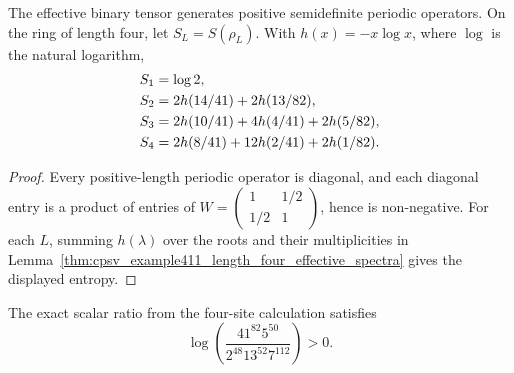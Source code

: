 \begin{lemma}
    \label{thm:cpsv_example411_length_four_effective_entropies}
    \leanok
    The effective binary tensor generates positive semidefinite periodic
    operators.  On the ring of length four, let $S_L=S(\rho_L)$.  With
    $h(x)=-x\log x$, where $\log$ is the natural logarithm,
    \begin{align}
        S_1 & =\log 2,\notag                      \\
        S_2 & =2h(14/41)+2h(13/82),\notag         \\
        S_3 & =2h(10/41)+4h(4/41)+2h(5/82),\notag \\
        S_4 & =2h(8/41)+12h(2/41)+2h(1/82).
        \notag
    \end{align}
\end{lemma}

\begin{proof}
    \leanok
    Every positive-length periodic operator is diagonal, and each diagonal
    entry is a product of entries of
    $W=\left(\begin{smallmatrix}1&1/2\\1/2&1\end{smallmatrix}\right)$, hence is
    non-negative.  For each $L$, summing $h(\lambda)$ over the roots and their
    multiplicities in
    Lemma~\ref{thm:cpsv_example411_length_four_effective_spectra} gives the
    displayed entropy.
\end{proof}

\begin{lemma}
    \label{thm:cpsv_example411_log_ratio_pos}
    \leanok
    The exact scalar ratio from the four-site calculation satisfies
    \[
        \log\!\left(
        \frac{41^{82}5^{50}}{2^{48}13^{52}7^{112}}
        \right)>0.
    \]
\end{lemma}

